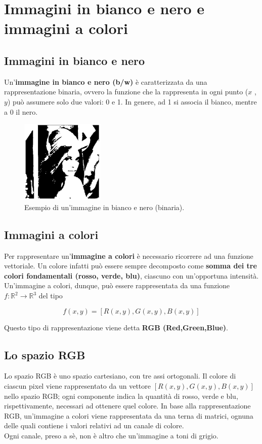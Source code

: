 \section{Immagini in bianco e nero e immagini a colori}

\subsection{Immagini in bianco e nero}

Un'\textbf{immagine in bianco e nero (b/w)} è caratterizzata da una
rappresentazione binaria, ovvero la funzione che la rappresenta in
ogni punto ($x$ , $y$) può assumere solo due valori: 0 e 1. In genere,
ad 1 si associa il bianco, mentre a 0 il nero.

\begin{figure}[H]
    \centering
    \includegraphics[width=4cm, keepaspectratio]{capitoli/immagini/imgs/immagine_binaria_bianco_nero.jpg}
    \caption{Esempio di un'immagine in bianco e nero (binaria).}
\end{figure}

\subsection{Immagini a colori}

Per rappresentare un'\textbf{immagine a colori} è necessario ricorrere ad
una funzione vettoriale. Un colore infatti può essere sempre
decomposto come \textbf{somma dei tre colori fondamentali (rosso, verde,
    blu)}, ciascuno con un'opportuna intensità.
Un'immagine a colori, dunque, può essere rappresentata da una
funzione $f: \mathbb{R}^2 \rightarrow \mathbb{R}^3$ del tipo

$$
    f(x, y) = [R(x, y), G(x, y), B(x, y)]
$$

Questo tipo di rappresentazione viene detta \textbf{RGB (Red,Green,Blue)}.
\subsection{Lo spazio RGB}

Lo spazio RGB è uno spazio cartesiano, con tre assi ortogonali.
Il colore di ciascun pixel viene rappresentato da un vettore
$[R(x , y), G(x , y), B(x , y)]$ nello spazio RGB; ogni componente
indica la quantità di rosso, verde e blu, rispettivamente, necessari
ad ottenere quel colore.
In base alla rappresentazione RGB, un'immagine a colori viene
rappresentata da una terna di matrici, ognuna delle quali contiene i
valori relativi ad un canale di colore.\\
Ogni canale, preso a sè, non è altro che un'immagine a toni di
grigio.


